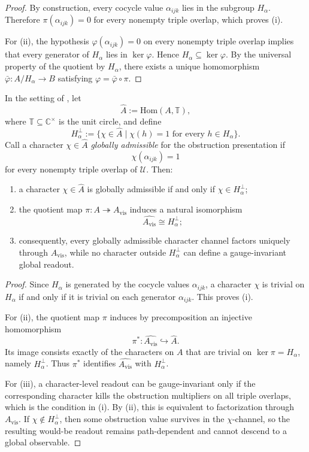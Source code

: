 \begin{proof}
By construction, every cocycle value $\alpha_{ijk}$ lies in the subgroup $H_\alpha$. Therefore $\pi(\alpha_{ijk})=0$ for every nonempty triple overlap, which proves (i).

For (ii), the hypothesis $\varphi(\alpha_{ijk})=0$ on every nonempty triple overlap implies that every generator of $H_\alpha$ lies in $\ker\varphi$. Hence $H_\alpha\subseteq\ker\varphi$. By the universal property of the quotient by $H_\alpha$, there exists a unique homomorphism $\bar\varphi:A/H_\alpha\to B$ satisfying $\varphi=\bar\varphi\circ\pi$.
\end{proof}

\begin{theorem}\label{thm:character-definability-barrier}
In the setting of , let
\[
\widehat A:=\mathrm{Hom}(A,\mathbb T),
\]
where $\mathbb T\subseteq\mathbb C^\times$ is the unit circle, and define
\[
H_\alpha^\perp:=\{\chi\in\widehat A\mid \chi(h)=1\text{ for every }h\in H_\alpha\}.
\]
Call a character $\chi\in\widehat A$ \emph{globally admissible} for the obstruction presentation if
\[
\chi(\alpha_{ijk})=1
\]
for every nonempty triple overlap of $\mathcal U$. Then:
\begin{enumerate}[label=(\roman*),nosep]
\item a character $\chi\in\widehat A$ is globally admissible if and only if $\chi\in H_\alpha^\perp$;
\item the quotient map $\pi:A\twoheadrightarrow A_{\mathrm{vis}}$ induces a natural isomorphism
\[
\widehat{A_{\mathrm{vis}}}\cong H_\alpha^\perp;
\]
\item consequently, every globally admissible character channel factors uniquely through $A_{\mathrm{vis}}$, while no character outside $H_\alpha^\perp$ can define a gauge-invariant global readout.
\end{enumerate}
\end{theorem}

\begin{proof}
Since $H_\alpha$ is generated by the cocycle values $\alpha_{ijk}$, a character $\chi$ is trivial on $H_\alpha$ if and only if it is trivial on each generator $\alpha_{ijk}$. This proves (i).

For (ii), the quotient map $\pi$ induces by precomposition an injective homomorphism
\[
\pi^*:\widehat{A_{\mathrm{vis}}}\hookrightarrow \widehat A.
\]
Its image consists exactly of the characters on $A$ that are trivial on $\ker\pi=H_\alpha$, namely $H_\alpha^\perp$. Thus $\pi^*$ identifies $\widehat{A_{\mathrm{vis}}}$ with $H_\alpha^\perp$.

For (iii), a character-level readout can be gauge-invariant only if the corresponding character kills the obstruction multipliers on all triple overlaps, which is the condition in (i). By (ii), this is equivalent to factorization through $A_{\mathrm{vis}}$. If $\chi\notin H_\alpha^\perp$, then some obstruction value survives in the $\chi$-channel, so the resulting would-be readout remains path-dependent and cannot descend to a global observable.
\end{proof}

